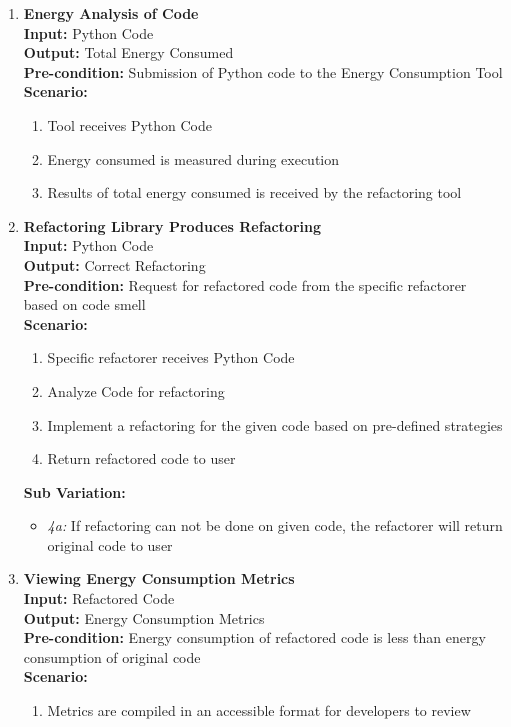 \documentclass[12pt]{article}
\begin{document}
\begin{enumerate}[label={\bf BUC \arabic*:}, wide=0pt, font=\itshape]
  \item {\bf Energy Analysis of Code}\\[2mm]
    \textbf{Input:} Python Code \\
    \textbf{Output:} Total Energy Consumed \\
    \textbf{Pre-condition:} Submission of Python code to the Energy
    Consumption Tool \\[2mm]
    \textbf{Scenario: }
    \begin{enumerate}[label=\arabic*.]
      \item Tool receives Python Code
      \item Energy consumed is measured during execution
      \item Results of total energy consumed is received by the refactoring tool
    \end{enumerate}

  \item {\bf Refactoring Library Produces Refactoring} \\[2mm]
    \textbf{Input:} Python Code \\
    \textbf{Output:} Correct Refactoring \\
    \textbf{Pre-condition:} Request for refactored code from the specific refactorer 
    based on code smell\\[2mm]
    \textbf{Scenario: }
    \begin{enumerate}[label=\arabic*.]
      \item Specific refactorer receives Python Code
      \item Analyze Code for refactoring
      \item Implement a refactoring for the given code based on pre-defined strategies
      \item Return refactored code to user
    \end{enumerate}
    \textbf{Sub Variation: }
    \begin{itemize}
      \item \textit{4a:} If refactoring can not be done on given code, the refactorer 
      will return original code to user
    \end{itemize}

  \item {\bf Viewing Energy Consumption Metrics} \\[2mm]
    \textbf{Input:} Refactored Code \\
    \textbf{Output:} Energy Consumption Metrics \\
    \textbf{Pre-condition:} Energy consumption of refactored code is less than energy consumption 
    of original code \\[2mm]
    \textbf{Scenario: }
    \begin{enumerate}[label=\arabic*.]
      \item Metrics are compiled in an accessible format for developers to review
    \end{enumerate}
\end{enumerate}
\end{document}
